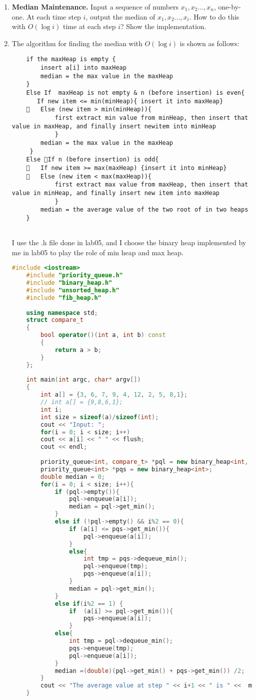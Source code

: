 \documentclass[12pt,a4paper]{article}
\makeatletter
\newtheorem*{solution}{Solution}
\theoremstyle{definition}
\renewenvironment{solution}[1][Solution] {\par\pushQED{\qed}\normalfont\topsep6\p@\@plus6\p@\relax\trivlist\item[\hskip\labelsep\bfseries#1\@addpunct{.}]\ignorespaces}{\popQED\endtrivlist\@endpefalse} \makeatother
\makeatother
\begin{document}
\begin{enumerate}
\item \textbf{Median Maintenance.} Input a sequence of numbers $x_1,x_2...,x_n$, one-by-one. At each time step $i$, output the median of $x_1,x_2...,x_i$. How to do this with $O(\log i)$ time at each step $i$? Show the implementation.
\begin{solution}
	The algorithm for finding the median with $O(\log i)$ is shown as follows:
	\begin{lstlisting}
	if the maxHeap is empty {
		insert a[i] into maxHeap
		median = the max value in the maxHeap
	}
	Else If  maxHeap is not empty & n (before insertion) is even{
	   If new item <= min(minHeap){ insert it into maxHeap}
		Else (new item > min(minHeap)){
			first extract min value from minHeap, then insert that value in maxHeap, and finally insert newitem into minHeap
			}
		median = the max value in the maxHeap
	 }
	Else If n (before insertion) is odd{
		If new item >= max(maxHeap) {insert it into minHeap}
		Else (new item < max(maxHeap)){
			first extract max value from maxHeap, then insert that value in minHeap, and finally insert new item into maxHeap
			}
		median = the average value of the two root of in two heaps
	}
	
	\end{lstlisting}
	
	I use the .h file done in lab05, and I choose the binary heap implemented by me in lab05 to play the role of min heap and max heap.
	\begin{lstlisting}[language=C++]
	#include <iostream>
	#include "priority_queue.h"
	#include "binary_heap.h"
	#include "unsorted_heap.h"
	#include "fib_heap.h"
	
	using namespace std;
	struct compare_t
	{
		bool operator()(int a, int b) const
		{
			return a > b;
		}
	};
	
	int main(int argc, char* argv[])
	{
		int a[] = {3, 6, 7, 9, 4, 12, 2, 5, 8,1};
		// int a[] = {9,8,6,1};
		int i;
		int size = sizeof(a)/sizeof(int);
		cout << "Input: ";
		for(i = 0; i < size; i++)
		cout << a[i] << " " << flush;
		cout << endl;
	
		priority_queue<int, compare_t> *pql = new binary_heap<int, compare_t>;
		priority_queue<int> *pqs = new binary_heap<int>;
		double median = 0;
		for(i = 0; i < size; i++){
			if (pql->empty()){
				pql->enqueue(a[i]);
				median = pql->get_min();
			}
			else if (!pql->empty() && i%2 == 0){
				if (a[i] <= pqs->get_min()){
					pql->enqueue(a[i]);
				}
				else{
					int tmp = pqs->dequeue_min();
					pql->enqueue(tmp);
					pqs->enqueue(a[i]);
				}
				median = pql->get_min();
			}
			else if(i%2 == 1) {
				if  (a[i] >= pql->get_min()){
					pqs->enqueue(a[i]);
				}
			else{
				int tmp = pql->dequeue_min();
				pqs->enqueue(tmp);
				pql->enqueue(a[i]);
			}
			median =(double)(pql->get_min() + pqs->get_min()) /2;
		}
		cout << "The average value at step " << i+1 << " is " <<  median << endl;
	}
	

\end{lstlisting}
\end{solution}
\end{enumerate}
\end{document}
